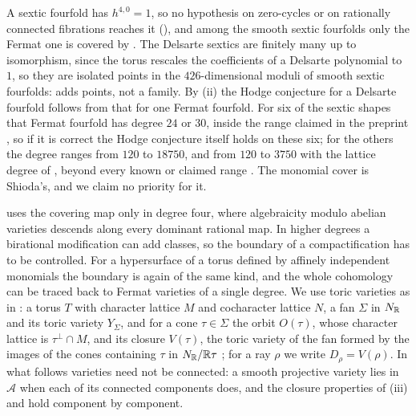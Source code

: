A sextic fourfold has $h^{4,0}=1$, so no hypothesis on zero-cycles or on
rationally connected fibrations reaches it (), and
among the smooth sextic fourfolds only the Fermat one is covered by
. The Delsarte sextics are finitely many
up to isomorphism, since the torus rescales the coefficients of a Delsarte
polynomial to $1$, so they are isolated points in the $426$-dimensional
moduli of smooth sextic fourfolds:  adds points, not a
family. By (ii) the Hodge conjecture for a Delsarte
fourfold follows from that for one Fermat fourfold. For six of the sextic
shapes that Fermat fourfold has degree $24$ or $30$, inside the range claimed
in the preprint \cite{MMMV26}, so if it is correct the Hodge conjecture
itself holds on these six; for the others the degree ranges from $120$ to
$18750$, and from $120$ to $3750$ with the lattice degree of
, beyond every known or claimed range
\cite{Shi79b,MMMV26,Jum26}.
The monomial cover is Shioda's, and we claim no priority for it.

 uses the covering map only in degree four, where
algebraicity modulo abelian varieties descends along every dominant rational
map. In higher degrees a birational modification can add classes, so the
boundary of a compactification has to be controlled. For a hypersurface of a
torus defined by affinely independent monomials the boundary is again of the
same kind, and the whole cohomology can be traced back to Fermat varieties
of a single degree. We use toric varieties as in \cite{CLS11}: a torus $T$
with character lattice $M$ and cocharacter lattice $N$, a fan $\Sigma$ in
$N_{\mathbb{R}}$ and its toric variety $Y_{\Sigma}$, and for a cone
$\tau\in\Sigma$ the orbit $O(\tau)$, whose character lattice is
$\tau^{\perp}\cap M$, and its closure $V(\tau)$, the toric variety of the
fan formed by the images of the cones containing $\tau$ in
$N_{\mathbb{R}}/\mathbb{R}\tau$ \cite[Chapter~3]{CLS11}; for a ray $\rho$ we write
$D_{\rho}=V(\rho)$. In what follows varieties need not be connected: a
smooth projective variety lies in $\mathcal{A}$ when each of its connected
components does, and the closure properties of (iii) and
 hold component by component.

